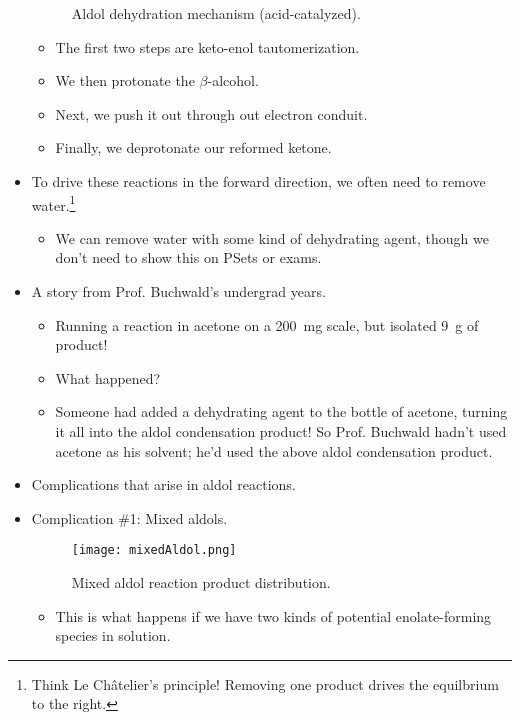 \documentclass[../notes.tex]{subfiles}
\begin{document}
\begin{itemize}
\begin{figure}[h!]
        \caption{Aldol dehydration mechanism (acid-catalyzed).}
        \label{fig:aldolDehMechAcid}
    \end{figure}
    \begin{itemize}
        \item The first two steps are keto-enol tautomerization.
        \item We then protonate the $\beta$-alcohol.
        \item Next, we push it out through out electron conduit.
        \item Finally, we deprotonate our reformed ketone.
    \end{itemize}
    \item To drive these reactions in the forward direction, we often need to remove water.\footnote{Think Le Ch\^{a}telier's principle! Removing one product drives the equilbrium to the right.}
    \begin{itemize}
        \item We can remove water with some kind of dehydrating agent, though we don't need to show this on PSets or exams.
    \end{itemize}
    \item A story from Prof. Buchwald's undergrad years.
    \begin{itemize}
        \item Running a reaction in acetone on a \SI{200}{\milli\gram} scale, but isolated \SI{9}{\gram} of product!
        \item What happened?
        \item Someone had added a dehydrating agent to the bottle of acetone, turning it all into the aldol condensation product! So Prof. Buchwald hadn't used acetone as his solvent; he'd used the above aldol condensation product.
    \end{itemize}
    \item Complications that arise in aldol reactions.
    \pagebreak
    \item Complication \#1: Mixed aldols.
    \begin{figure}[h!]
        \centering
        \texttt{[image: mixedAldol.png]}
        \caption{Mixed aldol reaction product distribution.}
        \label{fig:mixedAldol}
    \end{figure}
    \begin{itemize}
        \item This is what happens if we have two kinds of potential enolate-forming species in solution.

\end{itemize}
\end{itemize}
\end{document}
